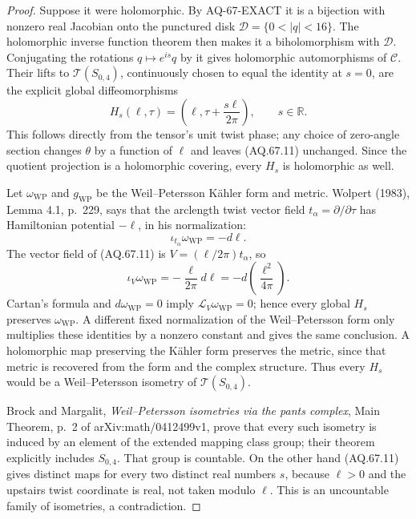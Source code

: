 \documentclass[11pt,a4paper]{article}
\theoremstyle{definition}\newtheorem{definition}[theorem]{Definition}
\theoremstyle{remark}\newtheorem{remark}[theorem]{Remark}
\begin{document}
\begin{proof}
Suppose it were holomorphic. By AQ-67-EXACT it is a bijection
with nonzero real Jacobian onto the punctured disk
$\mathcal D=\{0<|q|<16\}$. The holomorphic inverse function
theorem then makes it a biholomorphism with $\mathcal D$.
Conjugating the rotations $q\mapsto e^{is}q$ by it gives
holomorphic automorphisms of $\mathcal C$. Their lifts to
$\mathcal T(S_{0,4})$, continuously chosen to equal the identity
at $s=0$, are the explicit global diffeomorphisms
\[
 H_s(\ell,\tau)=
       \left(\ell,\tau+\frac{s\ell}{2\pi}\right),
                      \qquad s\in\mathbb R.                  \tag{AQ.67.11}
\]
This follows directly from the tensor's unit twist phase;
any choice of zero-angle section changes $\theta$ by a function
of $\ell$ and leaves (AQ.67.11) unchanged. Since the quotient
projection is a holomorphic covering, every $H_s$ is
holomorphic as well.

Let $\omega_{\mathrm{WP}}$ and $g_{\mathrm{WP}}$ be the
Weil--Petersson K\"ahler form and metric. Wolpert (1983),
Lemma 4.1, p.~229, says that the arclength twist vector field
$t_\alpha=\partial/\partial\tau$ has Hamiltonian potential
$-\ell$, in his normalization:
\[
 \iota_{t_\alpha}\omega_{\mathrm{WP}}=-d\ell.
\]
The vector field of (AQ.67.11) is
$V=(\ell/2\pi)t_\alpha$, so
\[
 \iota_V\omega_{\mathrm{WP}}
   =-\frac{\ell}{2\pi}d\ell
   =-d\!\left(\frac{\ell^2}{4\pi}\right).
\]
Cartan's formula and $d\omega_{\mathrm{WP}}=0$ imply
$\mathcal L_V\omega_{\mathrm{WP}}=0$; hence every global
$H_s$ preserves $\omega_{\mathrm{WP}}$. A different fixed
normalization of the Weil--Petersson form only multiplies
these identities by a nonzero constant and gives the same
conclusion. A holomorphic map preserving the K\"ahler form
preserves the metric, since that metric is recovered from
the form and the complex structure. Thus every $H_s$ would
be a Weil--Petersson isometry of $\mathcal T(S_{0,4})$.

Brock and Margalit, \emph{Weil--Petersson isometries via the
pants complex}, Main Theorem, p.~2 of arXiv:math/0412499v1,
prove that every such isometry is induced by an element of
the extended mapping class group; their theorem explicitly
includes $S_{0,4}$. That group is countable. On the other
hand (AQ.67.11) gives distinct maps for every two distinct
real numbers $s$, because $\ell>0$ and the upstairs twist
coordinate is real, not taken modulo $\ell$. This is an
uncountable family of isometries, a contradiction.
\end{proof}
\end{document}
